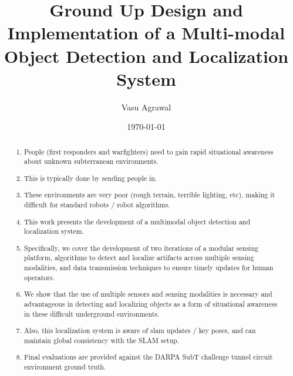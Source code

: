\documentclass[12pt]{cmuthesis}
\begin{document}
 
\frontmatter

\pagestyle{empty}

\title{ %
{\bf Ground Up Design and Implementation of a Multi-modal Object Detection and Localization System}}
\author{Vasu Agrawal}
\date{\today}


\support{}
\disclaimer{}



\maketitle


\pagestyle{plain} %


\begin{abstract}
\begin{enumerate}
	\item People (first responders and warfighters) need to gain rapid situational awareness about unknown subterranean environments.
	\item This is typically done by sending people in.
	\item These environments are very poor (rough terrain, terrible lighting, etc), making it difficult for standard robots / robot algorithms.
	\item This work presents the development of a multimodal object detection and localization system.
	\item Specifically, we cover the development of two iterations of a modular sensing platform, algorithms to detect and localize artifacts across multiple sensing modalities, and data transmission techniques to ensure timely updates for human operators.
	\item We show that the use of multiple sensors and sensing modalities is necessary and advantageous in detecting and localizing objects as a form of situational awareness in these difficult underground environments.
	\item Also, this localization system is aware of slam updates / key poses, and can maintain global consistency with the SLAM setup.
	\item Final evaluations are provided against the DARPA SubT challenge tunnel circuit environment ground truth.
\end{enumerate}
\end{abstract}
\end{document}
